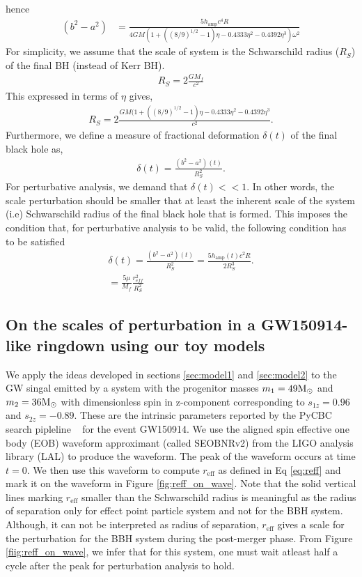 hence
\begin{align}
(b^{2}-a^{2}) &=\frac{5 h_{\mathrm{amp}} c^4 R}{4 G M  (1+ ((8/9)^{1/2} -1)\eta -0.4333 \eta^{2} -0.4392 \eta^{3})\omega^{2}}
\end{align}
For simplicity, we assume that the scale of system is the Schwarschild radius ($R_{S}$) of the final BH (instead of Kerr BH). 
\begin{align}
R_{S}= 2 \frac{G M_{f}}{c^2}
\end{align}
This expressed in terms of $\eta$ gives,
\begin{align}
R_{S}= 2 \frac{G M  (1+ ((8/9)^{1/2} -1)\eta -0.4333 \eta^{2} -0.4392 \eta^{3}}{c^2}.
\end{align}
Furthermore, we define a measure of fractional deformation $\delta(t)$ of the final black hole as,
\begin{align}
\delta(t)=\frac{(b^{2}-a^{2})(t)}{R_{S}^{2}}.
\end{align}
For perturbative analysis, we demand that $\delta(t)<<1$. In other words, the scale perturbation should be smaller that at least the inherent scale of the system (i.e) Schwarschild radius of the final black hole that is formed. This imposes the condition that, for perturbative analysis to be valid, the following condition has to be satisfied
\begin{align}
\label{eq:deformation}
\delta(t)=\frac{(b^{2}-a^{2})(t)}{R_{S}^{2}}=\frac{5 h_{\mathrm{amp}}(t) c^2 R}{2 R^{3}_{S}}.
\\ =\frac{5 \mu}{M_{f}}\frac{r^{2}_{eff}}{R^{2}_{S}}
\end{align}


\subsection{On the scales of perturbation in a GW150914-like ringdown using our toy models}
\label{sec:applicationToWaveform}
We apply the ideas developed in sections \ref{sec:model1} and \ref{sec:model2} to the GW singal emitted by a system with the progenitor masses $m_{1}=49 \mathrm{M}_\odot$ and $m_{2}= 36 \mathrm{M}_\odot$ with dimensionless spin in z-component corresponding to $s_{1z}=0.96$ and $s_{2z}=-0.89$. These are the intrinsic parameters reported by the PyCBC search pipleline ~\cite{Canton:2014ena,Usman:2015kfa,Nitz:2017svb} for the event GW150914. We use the aligned spin effective one body (EOB) waveform approximant (called SEOBNRv2) from the LIGO analysis library (LAL) to produce the waveform. The peak of the waveform occurs at time $t=0$. We then use this waveform to compute $r_{\mathrm{eff}}$ as defined in Eq \ref{eq:reff} and mark it on the waveform in Figure \ref{fig:reff_on_wave}. Note that the solid vertical lines marking $r_{\mathrm{eff}}$ smaller than the Schwarschild radius is meaningful as the radius of separation only for effect point particle system and not for the BBH system. Although, it can not be interpreted as radius of separation, $r_{\mathrm{eff}}$ gives a scale for the perturbation for the BBH system during the  post-merger phase. From Figure \ref{fiig:reff_on_wave}, we infer that for this system, one must wait atleast half a cycle after the peak for perturbation analysis to hold. 

